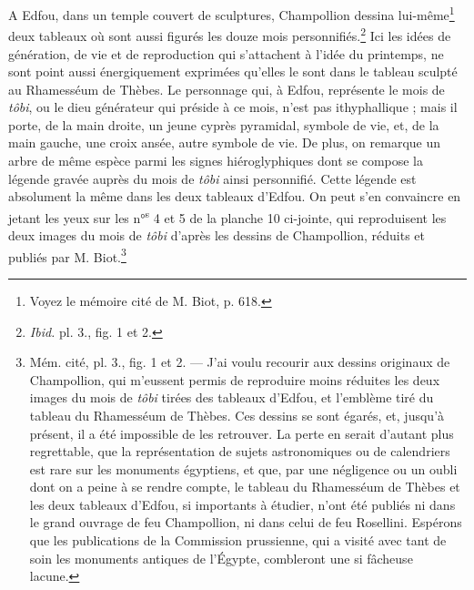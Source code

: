 \documentclass{article}
\begin{document}
A Edfou, dans un temple couvert de sculptures, Champollion dessina lui-même\footnote{Voyez le mémoire cité de M. Biot, p. 618.} deux tableaux où sont aussi figurés les douze mois personnifiés.\footnote{\emph{Ibid.} pl. 3., fig. 1 et 2.} Ici les idées de génération, de vie et de reproduction qui s'attachent à l'idée du printemps, ne sont point aussi énergiquement exprimées qu'elles le sont dans le tableau sculpté au Rhamesséum de Thèbes. Le personnage qui, à Edfou, représente le mois de \emph{tôbi}, ou le dieu générateur qui préside à ce mois, n'est pas ithyphallique ; mais il porte, de la main droite, un jeune cyprès pyramidal, symbole de vie, et, de la main gauche, une croix ansée, autre symbole de vie. De plus, on remarque un arbre de même espèce parmi les signes hiéroglyphiques dont se compose la légende gravée auprès du mois de \emph{tôbi} ainsi personnifié. Cette légende est absolument la même dans les deux tableaux d'Edfou. On peut s'en convaincre en jetant les yeux sur les n°\textsuperscript{s} 4 et 5 de la planche 10 ci-jointe, qui reproduisent les deux images du mois de \emph{tôbi} d'après les dessins de Champollion, réduits et publiés par M. Biot.\footnote{Mém. cité, pl. 3., fig. 1 et 2. --- J'ai voulu recourir aux dessins originaux de Champollion, qui m'eussent permis de reproduire moins réduites les deux images du mois de \emph{tôbi} tirées des tableaux d'Edfou, et l'emblème tiré du tableau du Rhamesséum de Thèbes. Ces dessins se sont égarés, et, jusqu'à présent, il a été impossible de les retrouver. La perte en serait d'autant plus regrettable, que la représentation de sujets astronomiques ou de calendriers est rare sur les monuments égyptiens, et que, par une négligence ou un oubli dont on a peine à se rendre compte, le tableau du Rhamesséum de Thèbes et les deux tableaux d'Edfou, si importants à étudier, n'ont été publiés ni dans le grand ouvrage de feu Champollion, ni dans celui de feu Rosellini. Espérons que les publications de la Commission prussienne, qui a visité avec tant de soin les monuments antiques de l'Égypte, combleront une si fâcheuse lacune.}
\end{document}
